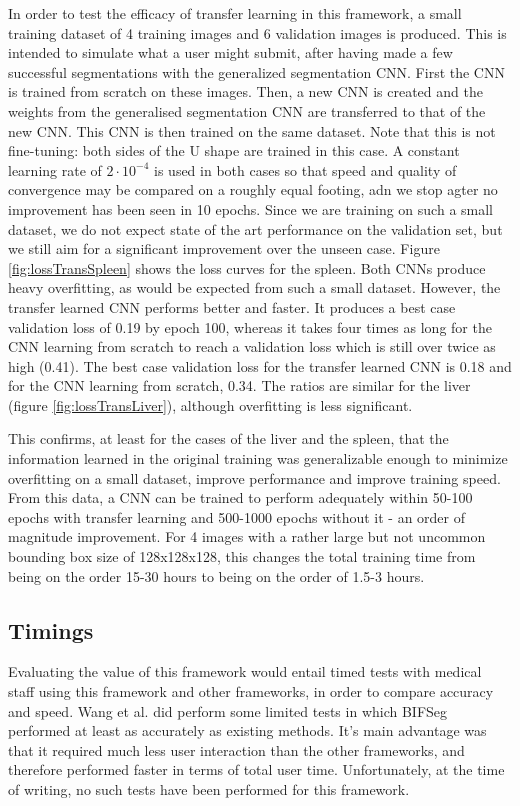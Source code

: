 In order to test the efficacy of transfer learning in this framework, a small training dataset of 4 training images and 6 validation images is produced. This is intended to simulate what a user might submit, after having made a few successful segmentations with the generalized segmentation CNN. First the CNN is trained from scratch on these images. Then, a new CNN is created and the weights from the generalised segmentation CNN are transferred to that of the new CNN. This CNN is then trained on the same dataset. Note that this is not fine-tuning: both sides of the U shape are trained in this case. A constant learning rate of $2 \cdot 10^{-4}$ is used in both cases so that speed and quality of convergence may be compared on a roughly equal footing, adn we stop agter no improvement has been seen in 10 epochs. Since we are training on such a small dataset, we do not expect state of the art performance on the validation set, but we still aim for a significant improvement over the unseen case. Figure \ref{fig:lossTransSpleen} shows the loss curves for the spleen. Both CNNs produce heavy overfitting, as would be expected from such a small dataset. However, the transfer learned CNN performs better and faster. It produces a best case validation loss of 0.19 by epoch 100, whereas it takes four times as long for the CNN learning from scratch to reach a validation loss which is still over twice as high (0.41). The best case validation loss for the transfer learned CNN is 0.18 and for the CNN learning from scratch, 0.34. The ratios are similar for the liver (figure \ref{fig:lossTransLiver}), although overfitting is less significant.

This confirms, at least for the cases of the liver and the spleen, that the information learned in the original training was generalizable enough to minimize overfitting on a small dataset, improve performance and improve training speed. From this data, a CNN can be trained to perform adequately within 50-100 epochs with transfer learning and 500-1000 epochs without it - an order of magnitude improvement. For 4 images with a rather large but not uncommon bounding box size of 128x128x128, this changes the total training time from being on the order 15-30 hours to being on the order of 1.5-3 hours.

\subsection{Timings}
Evaluating the value of this framework would entail timed tests with medical staff using this framework and other frameworks, in order to compare accuracy and speed. Wang et al. did perform some limited tests in which BIFSeg performed at least as accurately as existing methods. It's main advantage was that it required much less user interaction than the other frameworks, and therefore performed faster in terms of total user time. Unfortunately, at the time of writing, no such tests have been performed for this framework. 

